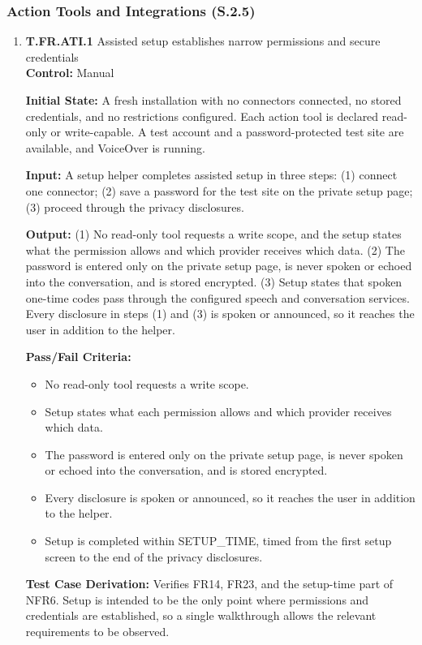 \documentclass[12pt, titlepage]{article}
\begin{document}
\subsubsection{Action Tools and Integrations (S.2.5)}
\begin{enumerate}

\item{\textbf{T.FR.ATI.1} Assisted setup establishes narrow permissions and secure credentials\\}\label{test:T.FR.ATI.1}
\textbf{Control:} Manual

\textbf{Initial State:} A fresh installation with no connectors connected, no stored credentials, and no restrictions configured.
Each action tool is declared read-only or write-capable. A test account and a password-protected test site are available, and VoiceOver is running.

\textbf{Input:} A setup helper completes assisted setup in three steps: (1) connect one connector; (2) save a password for the test site on the private setup page; 
(3) proceed through the privacy disclosures.

\textbf{Output:} (1) No read-only tool requests a write scope, and the setup states what the permission allows and which provider receives which data.
(2) The password is entered only on the private setup page, is never spoken or echoed into the conversation, and is stored encrypted. (3) Setup states that spoken one-time codes pass through the configured
speech and conversation services. Every disclosure in steps (1) and (3) is spoken or announced, so it reaches the user in addition to the helper.

\textbf{Pass/Fail Criteria:}
\begin{itemize}
  \item No read-only tool requests a write scope.
  \item Setup states what each permission allows and which provider receives which data.
  \item The password is entered only on the private setup page, is never spoken or echoed into the conversation, and is stored encrypted.
  \item Every disclosure is spoken or announced, so it reaches the user in addition to the helper.
  \item Setup is completed within SETUP\_TIME, timed from the first setup screen to the end of the privacy disclosures.
\end{itemize}

\textbf{Test Case Derivation:} Verifies FR14, FR23, and the setup-time part of NFR6. Setup is intended to be the only point where permissions and credentials are established, so a single walkthrough
allows the relevant requirements to be observed.


\end{enumerate}
\end{document}
